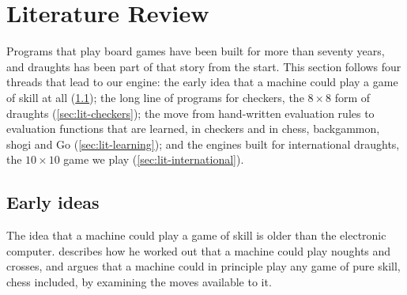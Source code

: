 \section{Literature Review}\label{sec:lit}


Programs that play board games have been built for more than seventy years, and
draughts has been part of that story from the start. This section follows four
threads that lead to our engine: the early idea that a machine could play a game
of skill at all (\cref{sec:lit-origins}); the long line of programs for checkers,
the $8\times8$ form of draughts (\cref{sec:lit-checkers}); the move from
hand-written evaluation rules to evaluation functions that are learned, in
checkers and in chess, backgammon, shogi and Go (\cref{sec:lit-learning}); and
the engines built for international draughts, the $10\times10$ game we play
(\cref{sec:lit-international}).

\subsection{Early ideas}\label{sec:lit-origins}

The idea that a machine could play a game of skill is older than the electronic
computer. \textcite{babbage1864} describes how he worked out that a machine could
play noughts and crosses, and argues that a machine could in principle play any
game of pure skill, chess included, by examining the moves available to it.

